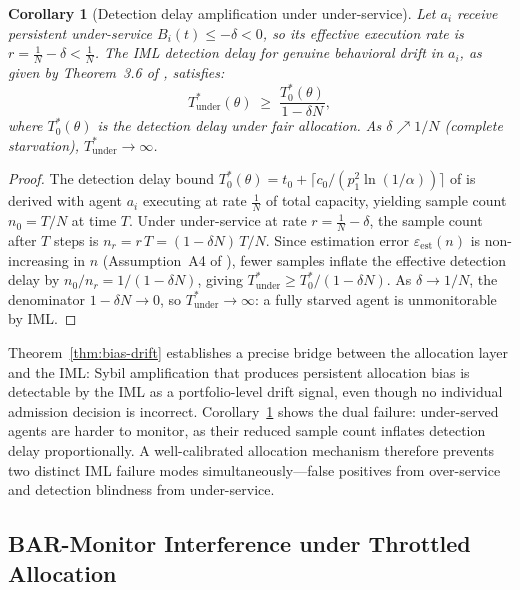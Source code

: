\documentclass[11pt]{article}
\theoremstyle{plain}
\newtheorem{corollary}[theorem]{Corollary}
\theoremstyle{definition}
\theoremstyle{remark}
\begin{document}
\begin{corollary}[Detection delay amplification under under-service]
\label{cor:underservice}
Let $a_i$ receive persistent under-service $B_i(t) \leq -\delta < 0$,
so its effective execution rate is
$r = \tfrac{1}{N} - \delta < \tfrac{1}{N}$.
The IML detection delay for genuine behavioral drift in $a_i$,
as given by Theorem~3.6 of \citet{fernandez2026c}, satisfies:
\[
  T^*_{\mathrm{under}}(\theta)
  \;\geq\; \frac{T^*_0(\theta)}{1 - \delta N},
\]
where $T^*_0(\theta)$ is the detection delay under fair allocation.
As $\delta \nearrow 1/N$ (complete starvation), $T^*_{\mathrm{under}} \to \infty$.
\end{corollary}

\begin{proof}
The detection delay bound
$T^*_0(\theta) = t_0 + \lceil c_0/(p_1^2\ln(1/\alpha))\rceil$
of \citet{fernandez2026c} is derived with agent $a_i$ executing at
rate $\tfrac{1}{N}$ of total capacity, yielding sample count
$n_0 = T/N$ at time $T$.  Under under-service at rate
$r = \tfrac{1}{N} - \delta$, the sample count after $T$ steps is
$n_r = r\,T = (1 - \delta N)\,T/N$.
Since estimation error $\varepsilon_{\mathrm{est}}(n)$ is
non-increasing in $n$ (Assumption~A4 of \citet{fernandez2026c}),
fewer samples inflate the effective detection delay by
$n_0/n_r = 1/(1 - \delta N)$, giving
$T^*_{\mathrm{under}} \geq T^*_0/(1 - \delta N)$.
As $\delta \to 1/N$, the denominator $1 - \delta N \to 0$, so
$T^*_{\mathrm{under}} \to \infty$: a fully starved agent is
unmonitorable by IML.
\end{proof}

Theorem~\ref{thm:bias-drift} establishes a precise bridge between the
allocation layer and the IML: Sybil amplification that produces
persistent allocation bias is detectable by the IML as a
portfolio-level drift signal, even though no individual admission
decision is incorrect.  Corollary~\ref{cor:underservice} shows the
dual failure: under-served agents are harder to monitor, as their
reduced sample count inflates detection delay proportionally.
A well-calibrated allocation mechanism therefore prevents two distinct
IML failure modes simultaneously---false positives from over-service
and detection blindness from under-service.

\subsection{BAR-Monitor Interference under Throttled Allocation}
\label{sec:bar-interference}
\end{document}
